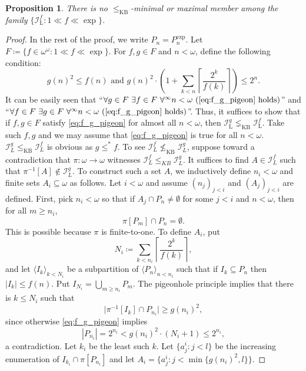 \documentclass[a4paper,12pt]{amsart}
\newtheorem{prop}[thm]{Proposition}
\theoremstyle{definition}
\numberwithin{thm}{section}
\numberwithin{equation}{section}
\newcommand{\oo}{{\omega}^\omega}
\newcommand{\I}{\mathscr{I}}
\renewcommand{\subset}{\subseteq}
\begin{document}
    \begin{prop}\label{prop:no_KB_minimal}
	   There is no $\leq_{\mathrm{KB}}$-minimal or maximal member among the family $\{\mathscr{I}_{\mathrm{L}}^f:1\ll f\ll\exp\}$.
    \end{prop}
    \begin{proof}
    	In the rest of the proof, we write $P_n = P_n^{\exp}$. 
    	Let $F\coloneqq\{f\in\oo:1\ll f\ll\exp\}$.
    	For $f,g\in F$ and $n<\omega$, define the following condition:
    	\begin{equation}
    		\label{eq:f_g_pigeon}
    		g(n)^2\leq f(n)\text{ and }g(n)^2 \cdot \left( 1+\sum_{k<n} \left\lceil \frac{2^k}{f(k)} \right\rceil \right) \leq 2^n.
    	\end{equation}
    	It can be easily seen that ``$\forall g\in F~\exists f\in F~\forall^\infty n<\omega~(\text{\eqref{eq:f_g_pigeon} holds})$'' and ``$\forall f\in F~\exists g\in F~\forall^\infty n<\omega~(\text{\eqref{eq:f_g_pigeon} holds})$''.
    	Thus, it suffices to show that if $f,g\in F$ satisfy \eqref{eq:f_g_pigeon} for almost all $n<\omega$, then $\mathscr{I}_{\mathrm{L}}^g\lneq_{\mathrm{KB}}\mathscr{I}_{\mathrm{L}}^f$.
    	Take such $f,g$ and we may assume that \eqref{eq:f_g_pigeon} is true for all $n<\omega$. $\I_L^g \leq_{\mathrm{KB}}\I_L^f$ is obvious as $g\leq^* f$.	
    	To see $\I_L^f \not\leq_{\mathrm{KB}} \I_L^g$, suppose toward a contradiction that $\pi\colon\omega\to\omega$ witnesses $\I_L^f\leq_{KB}\I_L^g$. It suffices to find $A\in\I_L^f$ such that $\pi^{-1}[A]\notin\I_L^g$.
    	To construct such a set $A$, we inductively define $n_i<\omega$ and finite sets $A_i\subset\omega$ as follows.
    	Let $i<\omega$ and assume $(n_j)_{j<i}$ and $(A_j)_{j<i}$ are defined.
    	First, pick $n_i<\omega$ so that if $A_j\cap P_n\neq\emptyset$ for some $j<i$ and $n<\omega$, then for all $m\geq n_i$,
    	\begin{equation}\label{eqn:disjointness}
    		\pi[P_m]\cap P_n = \emptyset.
    	\end{equation}
    	This is possible because $\pi$ is finite-to-one. 
    	To define $A_i$, 
    	put \[N_i \coloneqq \sum_{k<n_i} \left\lceil \frac{2^k}{f(k)} \right\rceil ,\]
    	and let $\langle I_k\rangle_{k< N_i}$ be a subpartition of $\langle P_n\rangle_{n< n_i}$ such that if $I_k \subseteq P_n$ then $|I_k|\leq f(n)$. Put $I_{N_i} = \bigcup_{m\geq n_i}P_m$. The pigeonhole principle implies that there is $k\leq N_i$ such that
    	\[
    	\lvert\pi^{-1}[I_k]\cap P_{n_i}\rvert \geq g(n_i)^2,
    	\]
    	since otherwise \eqref{eq:f_g_pigeon} implies
    	\[|P_{n_i}|=2^{n_i}<g(n_i)^2\cdot (N_i+1)\leq 2^{n_i},\]
    	a contradiction.
    	Let $k_i$ be the least such $k$. Let $\{a^i_j: j<l\}$ be the increasing enumeration of $I_{k_i}\cap\pi[P_{n_i}]$ and let $A_i = \{a^i_j:j<\min\{g(n_i)^2, l\}\}$.
    	

\end{proof}
\end{document}
